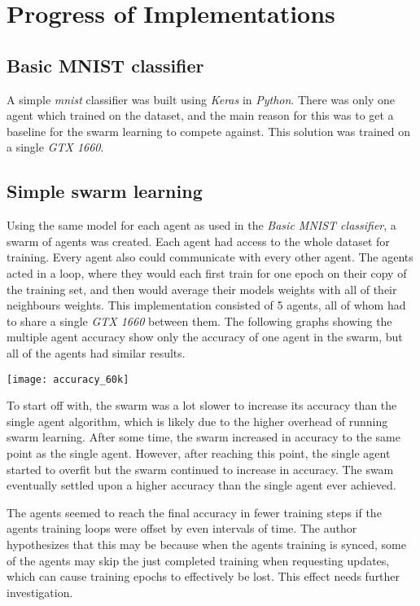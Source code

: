 \chapter{Progress of Implementations}

\section{Basic MNIST classifier}
A simple \emph{mnist} classifier was built using \emph{Keras} in \emph{Python}. There was only one agent which trained on the dataset, and the main reason for this was to get a baseline for the swarm learning to compete against. This solution was trained on a single \emph{GTX 1660}.

\section{Simple swarm learning}
Using the same model for each agent as used in the \emph{Basic MNIST classifier}, a swarm of agents was created. Each agent had access to the whole dataset for training. Every agent also could communicate with every other agent. The agents acted in a loop, where they would each first train for one epoch on their copy of the training set, and then would average their models weights with all of their neighbours weights. This implementation consisted of 5 agents, all of whom had to share a single \emph{GTX 1660} between them. The following graphs showing the multiple agent accuracy show only the accuracy of one agent in the swarm, but all of the agents had similar results.

\texttt{[image: accuracy\_60k]}

To start off with, the swarm was a lot slower to increase its accuracy than the single agent algorithm, which is likely due to the higher overhead of running swarm learning. After some time, the swarm increased in accuracy to the same point as the single agent. However, after reaching this point, the single agent started to overfit but the swarm continued to increase in accuracy. The swam eventually settled upon a higher accuracy than the single agent ever achieved.

The agents seemed to reach the final accuracy in fewer training steps if the agents training loops were offset by even intervals of time. The author hypothesizes that this may be because when the agents training is synced, some of the agents may skip the just completed training when requesting updates, which can cause training epochs to effectively be lost. This effect needs further investigation.

